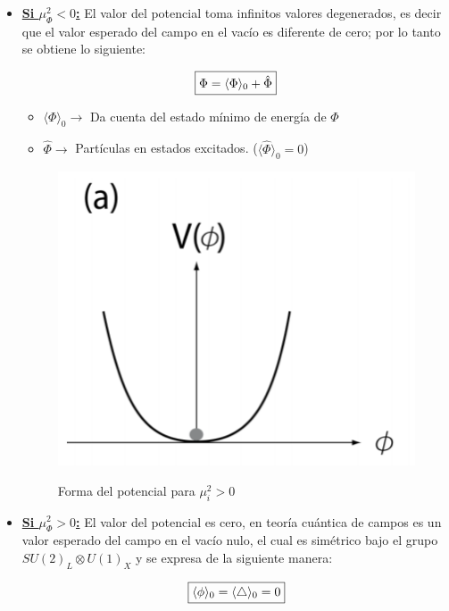 \documentclass[12pt]{article}
\begin{document}
\begin{itemize}
    \item\underline{ \textbf{Si \( \mu_\Phi^2<0 \):}} El valor del potencial toma infinitos valores degenerados, es decir que el valor esperado del campo en el vacío es diferente de cero; por lo tanto se obtiene lo siguiente: 
    
\[\fbox{$\Phi=\langle  \Phi \rangle_0 + \hat\Phi$}\]
\begin{itemize}
\item \(\langle  \Phi \rangle_0\rightarrow \)  Da cuenta del estado mínimo de energía de \(\Phi\)
\item \(\hat\Phi \rightarrow \) Partículas en estados excitados. (\(\langle \hat\Phi \rangle_0=0 \))
\end{itemize}

    \begin{figure}[h!]
    \begin{center}
        \includegraphics[scale=0.55]{Potencial Higgs.png}
        \caption\tiny{{Forma del potencial para $\mu_i^2>0$}}  
    \end{center}
\end{figure}


   \item\underline{ \textbf{Si \( \mu_\Phi^2> 0 \):}} El valor del potencial es cero, en teoría cuántica de campos es un valor esperado del campo en el vacío nulo, el cual es simétrico bajo el grupo \(SU(2)_L \otimes U(1)_X\) y se expresa de la siguiente manera: 
    
\[\fbox{$\langle  \phi \rangle_0= \langle  \triangle \rangle_0= 0$}\] 


\end{itemize}
\end{document}
